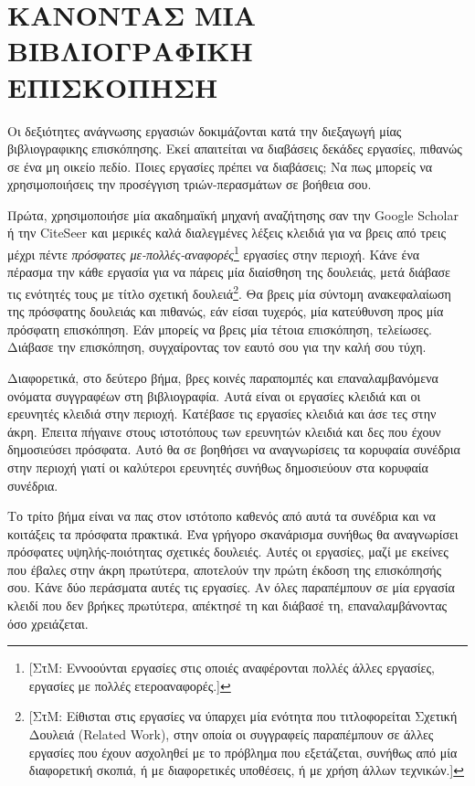 \documentclass{article}
\begin{document}
\section{ΚΑΝΟΝΤΑΣ ΜΙΑ ΒΙΒΛΙΟΓΡΑΦΙΚΗ ΕΠΙΣΚΟΠΗΣΗ}
\par
Οι δεξιότητες ανάγνωσης εργασιών δοκιμάζονται κατά την διεξαγωγή μίας βιβλιογραφικης επισκόπησης. Εκεί απαιτείται να διαβάσεις δεκάδες εργασίες, πιθανώς σε ένα μη οικείο πεδίο. Ποιες εργασίες πρέπει να διαβάσεις\textlatin{;} Να πως μπορείς να χρησιμοποιήσεις την προσέγγιση τριών-περασμάτων σε βοήθεια σου.
\par
Πρώτα, χρησιμοποιήσε μία ακαδημαϊκή μηχανή αναζήτησης σαν την \textlatin{Google Scholar} ή την \textlatin{CiteSeer} και μερικές καλά διαλεγμένες λέξεις κλειδιά για να βρεις από τρεις μέχρι πέντε \textit{πρόσφατες με-πολλές-αναφορές}\footnote{[ΣτΜ: Εννοούνται εργασίες στις οποιές αναφέρονται πολλές άλλες εργασίες, εργασίες με πολλές ετεροαναφορές.]} εργασίες στην περιοχή. Κάνε ένα πέρασμα την κάθε εργασία για να πάρεις μία διαίσθηση της δουλειάς, μετά διάβασε τις ενότητές τους με τίτλο σχετική δουλειά\footnote{[ΣτΜ: Είθισται στις εργασίες να ύπαρχει μία ενότητα που τιτλοφορείται Σχετική Δουλειά \textlatin{(Related Work)}, στην οποία οι συγγραφείς παραπέμπουν σε άλλες εργασίες που έχουν ασχοληθεί με το πρόβλημα που εξετάζεται, συνήθως από μία διαφορετική σκοπιά, ή με διαφορετικές υποθέσεις, ή με χρήση άλλων τεχνικών.]}. Θα βρεις μία σύντομη ανακεφαλαίωση της πρόσφατης δουλειάς και πιθανώς, εάν είσαι τυχερός, μία κατεύθυνση προς μία πρόσφατη επισκόπηση. Εάν μπορείς να βρεις μία τέτοια επισκόπηση, τελείωσες. Διάβασε την επισκόπηση, συγχαίροντας τον εαυτό σου για την καλή σου τύχη.
\par
Διαφορετικά, στο δεύτερο βήμα, βρες κοινές παραπομπές και επαναλαμβανόμενα ονόματα συγγραφέων στη βιβλιογραφία. Αυτά είναι οι εργασίες κλειδιά και οι ερευνητές κλειδιά στην περιοχή. Κατέβασε τις εργασίες κλειδιά και άσε τες στην άκρη. Έπειτα πήγαινε στους ιστοτόπους των ερευνητών κλειδιά και δες που έχουν δημοσιεύσει πρόσφατα. Αυτό θα σε βοηθήσει να αναγνωρίσεις τα κορυφαία συνέδρια στην περιοχή γιατί οι καλύτεροι ερευνητές συνήθως δημοσιεύουν στα κορυφαία συνέδρια.
\par
Το τρίτο βήμα είναι να πας στον ιστότοπο καθενός από αυτά τα συνέδρια και να κοιτάξεις τα πρόσφατα πρακτικά. Ένα γρήγορο σκανάρισμα συνήθως θα αναγνωρίσει πρόσφατες υψηλής-ποιότητας σχετικές δουλειές. Αυτές οι εργασίες, μαζί με εκείνες που έβαλες στην άκρη πρωτύτερα, αποτελούν την πρώτη έκδοση της επισκόπησής σου. Κάνε δύο περάσματα αυτές τις εργασίες. Αν όλες παραπέμπουν σε μία εργασία κλειδί που δεν βρήκες πρωτύτερα, απέκτησέ τη και διάβασέ τη, επαναλαμβάνοντας όσο χρειάζεται.
\end{document}
